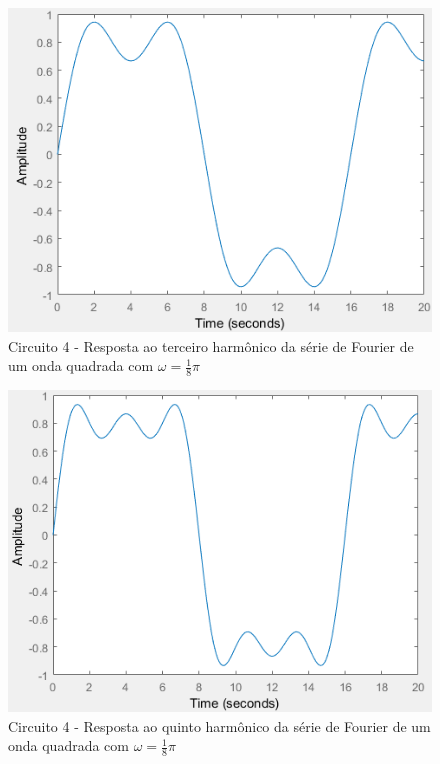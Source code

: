 \documentclass[a4paper, 12pt]{article}
\begin{document}
			\begin{figure}[!ht]
				\centering
				\includegraphics[scale=0.71]{img/1k_circ4.png}
				\caption{Circuito 4 - Resposta ao terceiro harmônico da série de Fourier de um onda quadrada com $\omega = \frac{1}{8}\pi$}
			\end{figure}
			\begin{figure}[!ht]
				\centering
				\includegraphics[scale=0.71]{img/1l_circ4.png}
				\caption{Circuito 4 - Resposta ao quinto harmônico da série de Fourier de um onda quadrada com $\omega = \frac{1}{8}\pi$}
			\end{figure}
\end{document}
